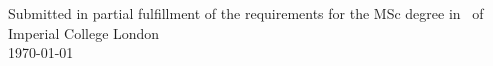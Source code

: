 \begin{titlepage}
    
    \vfill %
    Submitted in partial fulfillment of the requirements for the MSc degree in
    \degreetype~of Imperial College London\\[0.5cm]
    
    \makeatletter
    \today
    \makeatother


\end{titlepage}